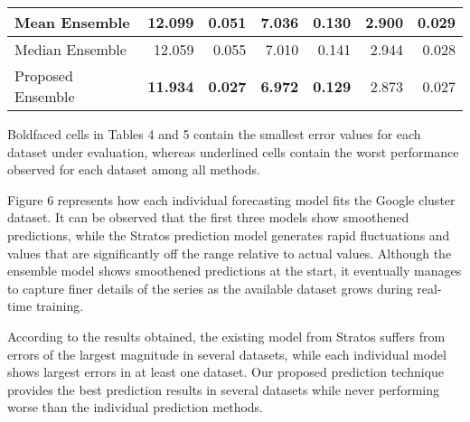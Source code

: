 \begin{table}[]
\begin{tabular}{|l|r|r|r|r|r|r|}
Mean Ensemble                                      & 12.099              & 0.051               & 7.036               & 0.130               & 2.900               & 0.029            \\ \hline
Median Ensemble                                      &  12.059              & 0.055               &  7.010               & 0.141               & 2.944               & 0.028            \\ \hline

Proposed Ensemble                                     & \textbf{11.934}           & \textbf{0.027}            & \textbf{6.972}            & \textbf{0.129}            & 2.873                     & 0.027                     \\ \hline
\end{tabular}
\end{table}

Boldfaced cells in Tables 4 and 5 contain the smallest error values for each dataset under evaluation, whereas underlined cells contain the worst performance observed for each dataset among all methods.

Figure 6 represents how each individual forecasting model fits the Google cluster dataset. It can be observed that the first three models show smoothened predictions, while the Stratos prediction model generates rapid fluctuations and values that are significantly off the range relative to actual values. Although the ensemble model shows smoothened predictions at the start, it eventually manages to capture finer details of the series as the available dataset grows during real-time training.

According to the results obtained, the existing model from Stratos suffers from errors of the largest magnitude in several datasets, while each individual model shows largest errors in at least one dataset. Our proposed prediction technique provides the best prediction results in several datasets while never performing worse than the individual prediction methods.